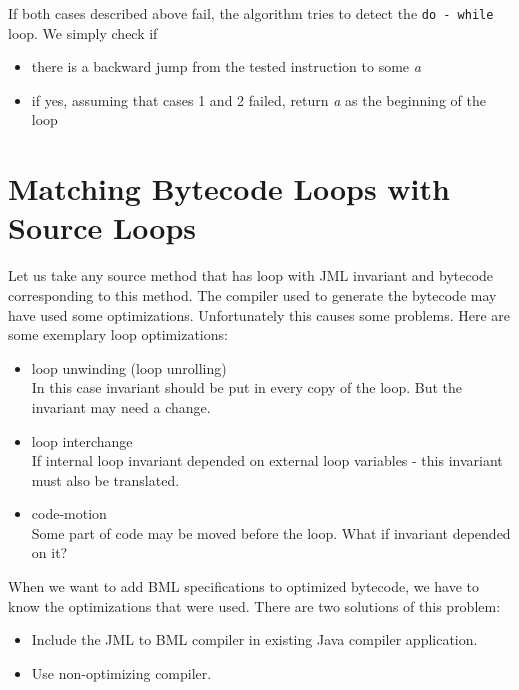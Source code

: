 \documentclass{acm_proc_article-sp}
\begin{document}
If both cases described above fail, the algorithm tries to detect the \texttt{do - while} loop. We simply check if
\begin{itemize}
\item{there is a backward jump from the tested instruction to some \textit{a}}
\item{if yes, assuming that cases 1 and 2 failed, return \textit{a} as the beginning of the loop}
\end{itemize}

\section{Matching Bytecode Loops with Source Loops}
Let us take any source method that has loop with JML invariant and bytecode corresponding to this method. The compiler used to generate the bytecode may have used some optimizations. Unfortunately this causes some problems. Here are some exemplary loop optimizations:
\begin{itemize}
	\item loop unwinding (loop unrolling)\\
In this case invariant should be put in every copy of the loop. But the invariant may need a change.
	\item loop interchange\\
If internal loop invariant depended on external loop variables - this invariant must also be translated.
	\item code-motion\\
Some part of code may be moved before the loop. What if invariant depended on it?
\end{itemize}
When we want to add BML specifications to optimized bytecode, we have to know the optimizations that were used. There are two solutions of this problem:
\begin{itemize}
	\item Include the JML to BML compiler in existing Java compiler application.
	\item Use non-optimizing compiler.
\end{itemize}
\end{document}
